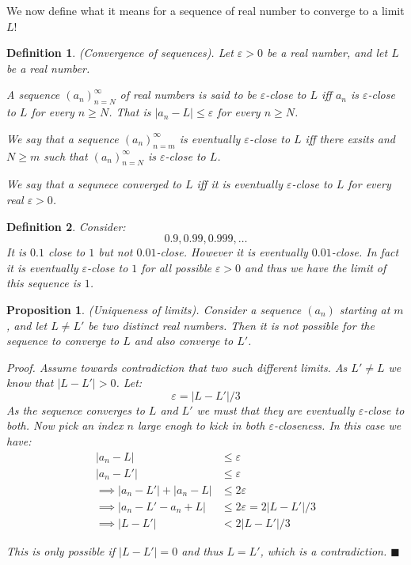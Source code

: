 \documentclass{article}
\newtheorem{definition}{Definition}[subsection]
\newtheorem{proposition}{Proposition}[subsection]
\newcommand{\vep}{\varepsilon} %
\let\it\textit
\begin{document}
We now define what it means for a sequence of real 
number to converge to a limit $L$! 

\begin{definition}
	(Convergence of sequences). Let $\vep > 0$ 
	be a real number, and let $L$ be a real 
	number. 

	A sequence $(a_n)_{n=N}^\infty$ of 
	real numbers is said to be $\vep$-close 
	to $L$ iff $a_n$ is $\vep$-close to 
	$L$  for every $n \geq N$. That is 
	$|a_n - L| \leq \vep$ for every $n \geq N$. 

	We say that a sequence $(a_n)_{n=m}^\infty$ 
	is eventually $\vep$-close to $L$ iff 
	there exsits and $N \geq m$ such that 
	$(a_n)_{n=N}^\infty$ is $\vep$-close to $L$.

	We say that a sequnece converged to $L$ 
	iff it is eventually $\vep$-close to $L$ 
	for every real $\vep > 0$.
\end{definition}

\begin{definition}
	Consider:
	$$
	0.9, 0.99,0.999, \dots
	$$
	It is $0.1$ close to $1$ but not $0.01$-close. 
	However it is eventually $0.01$-close. In fact
	it is eventually $\vep$-close to $1$ 
	for all possible $\vep > 0$ and thus 
	we have the limit of this sequence is $1$.
\end{definition}

\begin{proposition}
	(Uniqueness of limits). Consider a sequence
	$(a_n)$ starting at $m$, and let $L \neq L'$ 
	be two distinct real numbers. Then it 
	is not possible for the sequence to 
	converge to $L$ and also converge to 
	$L'$.

	\it{Proof}. Assume towards contradiction
	that two such different limits. 
	As $L' \neq L$ we know that 
	$|L - L'| > 0$.  Let:
	$$
	\vep = |L - L'|/3
	$$
	As the sequence converges to $L$  and $L'$ 
	we must that they are eventually $\vep$-close 
	to both. Now pick an index $n$ large enogh to kick 
	in both $\vep$-closeness. In this case we have:
	\begin{align*}
		|a_n - L| &\leq \vep \\	
		|a_n - L'| &\leq \vep \\	
	\implies |a_n - L'| + |a_n - L| &\leq 2\vep \\ 
	\implies |a_n - L' - a_n + L| &\leq 2\vep = 2|L - L'|/3 
	\tag*{By the triangle innequality}\\ 
	\implies |L - L'| &< 2|L - L'|/3
	\end{align*}  

	This is only possible if $|L - L'| = 0$ 
	and thus $L = L'$, which is a contradiction. 
	\hfill $\blacksquare$
\end{proposition}
\end{document}
